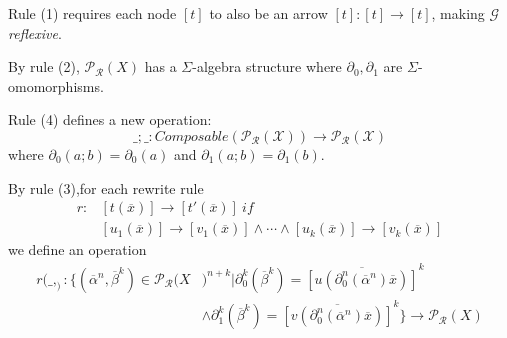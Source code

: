 \documentclass{beamer}
\begin{document}
\begin{frame}
    \scriptsize
    Rule (1) requires each node $[t]$ to also be an arrow $[t] : [t] \rightarrow [t]$, making $\mathcal{G}$ \emph{reflexive}.

    \bigskip
    \pause

    By rule (2), $\mathcal{P_R}(X)$ has a $\Sigma$-algebra structure where $\partial_0,\partial_1$ are 
    $\Sigma$-omomorphisms.

    \bigskip
    \pause
    Rule (4) defines a new operation:
    $$
    \_;\_ : Composable(\mathcal{P_R(X)}) \rightarrow \mathcal{P_R(X)}
    $$
    where $\partial_0(a;b) = \partial_0(a)$ and $\partial_1(a;b) = \partial_1(b)$.

    \bigskip
    \pause
    By rule (3),for each rewrite rule 
    \begin{align*}
        r:&[t(\overline{x})] \rightarrow [t'(\overline{x})]\ if \\ 
        &[u_1(\overline{x})] \rightarrow [v_1(\overline{x})] \wedge \cdots \wedge [u_k(\overline{x})] \rightarrow [v_k(\overline{x})] 
    \end{align*}
    we define an operation 
    \begin{align*}
        r(\_,_) : \{(\overline{\alpha}^n,\overline{\beta}^k) \in \mathcal{P_R}(X&)^{n+k} 
        | \partial_0^k(\overline{\beta}^k) = \overline{[u(\partial_0^n(\overline{\alpha}^n)\overline{x})]}^k \\
        &\wedge  \partial_1^k(\overline{\beta}^k) = \overline{[v(\partial_0^n(\overline{\alpha}^n)\overline{x})]}^k\} \rightarrow \mathcal{P_R}(X)
    \end{align*}
\end{frame}
\end{document}
